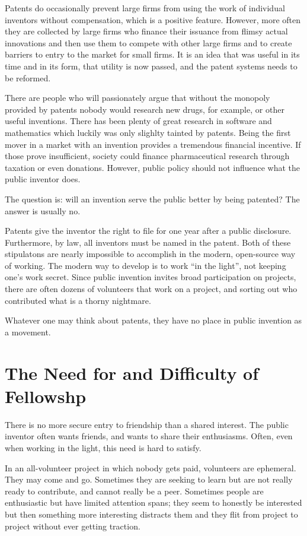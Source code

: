 \documentclass[
	fontsize=10pt, %
	twoside=false, %
	secnumdepth=1, %
]{kaobook}
\begin{document}
Patents do occasionally prevent large firms from using the
work of individual inventors without compensation, which
is a positive feature. However, more often they are collected
by large firms who finance their issuance from flimsy actual
innovations and then use them to compete with other large firms
and to create barriers to entry to the market for small firms.
It is an idea that was useful in its time and in its form,
that utility is now passed, and the patent systems needs
to be reformed.

There are people who will passionately argue that without
the monopoly provided by patents nobody would research new
drugs, for example, or other useful inventions.
There has been plenty of great research in software and
mathematics which luckily was only slighlty tainted by patents.
Being the first mover in a market with an invention provides
a tremendous financial incentive.
If those prove insufficient, society could finance
pharmaceutical research through taxation or
even donations.
However, public policy should not influence
what the public inventor does.

The question is: will an invention serve the public better
by being patented? The answer is usually no.

Patents give the inventor the right to file for one year
after a public disclosure. Furthermore, by law,
all inventors must be named in the patent. Both
of these stipulatons are nearly impossible to accomplish
in the modern, open-source way of working.
The modern way to develop is to work ``in the light'',
not keeping one's work secret.
Since public invention invites broad participation on projects,
there are often dozens of volunteers that work on a project,
and sorting out who contributed what is a thorny nightmare.

Whatever one may think about patents, they have no
place in public invention as a movement.

\section{The Need for and Difficulty of Fellowshp}

There is no more secure entry to friendship than a shared interest.
The public inventor often wants friends, and wants to share
their enthusiasms.
Often, even when working in the light, this need
is hard to satisfy.

In an all-volunteer project in which nobody gets paid,
volunteers are ephemeral. They may come and go.
Sometimes they are seeking to learn but are not
really ready to contribute, and cannot really
be a peer.
Sometimes people are enthusiastic but have limited
attention spans; they seem to honestly be interested
but then something more interesting distracts them and
they flit from project to project without ever getting traction.
\end{document}
